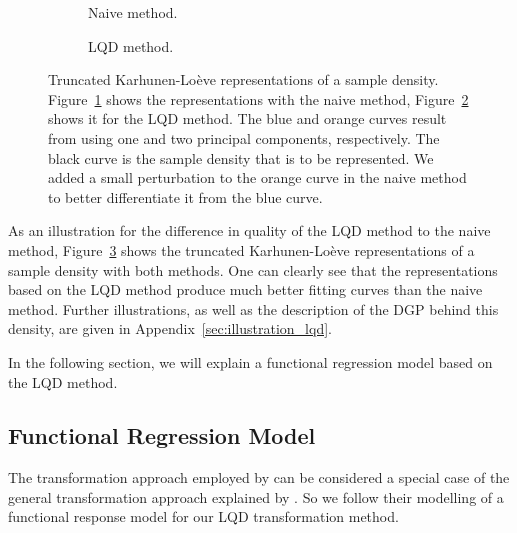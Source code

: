 \begin{figure}[h!]
    \centering
    \begin{subfigure}[b]{0.9\textwidth}
        \centering
        \resizebox{\linewidth}{!}{}
        \caption[Truncated representation --- naive]{Naive method.}
        \label{fig:naive_trunc_rep}
    \end{subfigure}
    \hfill %
    \begin{subfigure}[b]{0.9\textwidth}
        \centering
        \resizebox{\linewidth}{!}{}
        \caption[Truncated representation --- LQD method]{LQD method.}
        \label{fig:trunc_rep}
    \end{subfigure}
    \caption[Truncated Karhunen-Loève representations]{Truncated Karhunen-Loève
    representations of a sample density. Figure~\ref{fig:naive_trunc_rep} shows the
    representations with the naive method, Figure~\ref{fig:trunc_rep} shows it for
    the LQD method. The blue and orange curves result from using one
    and two principal components, respectively. The black curve is the sample density
    that is to be represented. We added a small perturbation to the orange curve in the
    naive method to better differentiate it from the blue curve.}
    \label{fig:trunc_reps}
\end{figure}

As an illustration for the difference in quality of the LQD method to the naive method,
Figure~\ref{fig:trunc_reps} shows the truncated Karhunen-Loève representations of a
sample density with both methods. One can clearly see that the representations based on
the LQD method produce much better fitting curves than the naive method. Further
illustrations, as well as the description of the DGP behind this density, are given in
Appendix~\ref{sec:illustration_lqd}.

In the following section, we will explain a functional regression model based on the
LQD method.

\subsection{Functional Regression Model}
\label{sec:func_reg_model}
The transformation approach employed by \textcite{TalskaEtAl2018} can be considered a
special case of the general transformation approach explained by \textcite{PetersenMüller2016}
\parencite[cf.][]{PetersenZhangKokoszka2022}. So we follow their modelling of a functional
response model for our LQD transformation method.

